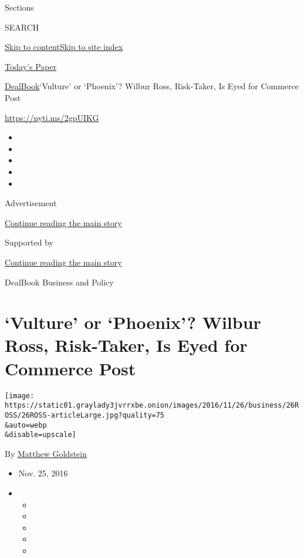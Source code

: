 Sections

SEARCH

\protect\hyperlink{site-content}{Skip to
content}\protect\hyperlink{site-index}{Skip to site index}

\href{https://myaccount.nytimes3xbfgragh.onion/auth/login?response_type=cookie\&client_id=vi}{}

\href{https://www.nytimes3xbfgragh.onion/section/todayspaper}{Today's
Paper}

\href{/section/business/dealbook}{DealBook}\textbar{}`Vulture' or
`Phoenix'? Wilbur Ross, Risk-Taker, Is Eyed for Commerce Post

\url{https://nyti.ms/2gpUIKG}

\begin{itemize}
\item
\item
\item
\item
\item
\end{itemize}

Advertisement

\protect\hyperlink{after-top}{Continue reading the main story}

Supported by

\protect\hyperlink{after-sponsor}{Continue reading the main story}

DealBook Business and Policy

\hypertarget{vulture-or-phoenix-wilbur-ross-risk-taker-is-eyed-for-commerce-post}{%
\section{`Vulture' or `Phoenix'? Wilbur Ross, Risk-Taker, Is Eyed for
Commerce
Post}\label{vulture-or-phoenix-wilbur-ross-risk-taker-is-eyed-for-commerce-post}}

\texttt{[image: https://static01.graylady3jvrrxbe.onion/images/2016/11/26/business/26ROSS/26ROSS-articleLarge.jpg?quality=75\\\&auto=webp\\\&disable=upscale]}

By \href{http://www.nytimes3xbfgragh.onion/by/matthew-goldstein}{Matthew
Goldstein}

\begin{itemize}
\item
  Nov. 25, 2016
\item
  \begin{itemize}
  \item
  \item
  \item
  \item
  \item
  \end{itemize}
\end{itemize}

